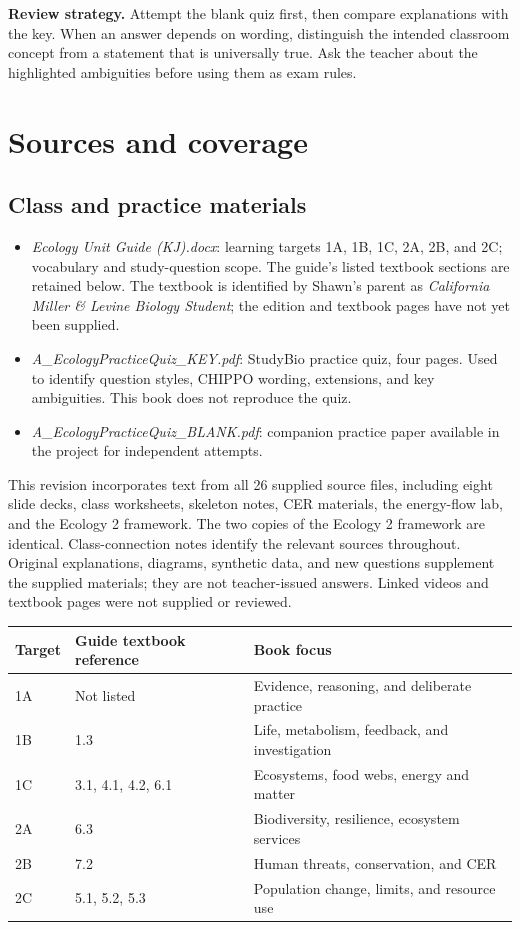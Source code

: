 \documentclass[11pt,letterpaper]{article}
\newcommand{\pagechapter}[2]{\clearpage\section*{#1}\phantomsection\label{#2}\addcontentsline{toc}{section}{#1}}
\begin{document}
\textbf{Review strategy.} Attempt the blank quiz first, then compare explanations with the key. When an answer depends on wording, distinguish the intended classroom concept from a statement that is universally true. Ask the teacher about the highlighted ambiguities before using them as exam rules.

\pagechapter{Sources and coverage}{sources}
\subsection*{Class and practice materials}
\begin{itemize}
\item \textit{Ecology Unit Guide (KJ).docx}: learning targets 1A, 1B, 1C, 2A, 2B, and 2C; vocabulary and study-question scope. The guide's listed textbook sections are retained below. The textbook is identified by Shawn's parent as \textit{California Miller \& Levine Biology Student}; the edition and textbook pages have not yet been supplied.
\item \textit{A\_EcologyPracticeQuiz\_KEY.pdf}: StudyBio practice quiz, four pages. Used to identify question styles, CHIPPO wording, extensions, and key ambiguities. This book does not reproduce the quiz.
\item \textit{A\_EcologyPracticeQuiz\_BLANK.pdf}: companion practice paper available in the project for independent attempts.
\end{itemize}
This revision incorporates text from all 26 supplied source files, including eight slide decks, class worksheets, skeleton notes, CER materials, the energy-flow lab, and the Ecology 2 framework. The two copies of the Ecology 2 framework are identical. Class-connection notes identify the relevant sources throughout. Original explanations, diagrams, synthetic data, and new questions supplement the supplied materials; they are not teacher-issued answers. Linked videos and textbook pages were not supplied or reviewed.
\par
\begin{tabularx}{\linewidth}{@{}l l Y@{}}\toprule
Target & Guide textbook reference & Book focus\\\midrule
1A & Not listed & Evidence, reasoning, and deliberate practice\\
1B & 1.3 & Life, metabolism, feedback, and investigation\\
1C & 3.1, 4.1, 4.2, 6.1 & Ecosystems, food webs, energy and matter\\
2A & 6.3 & Biodiversity, resilience, ecosystem services\\
2B & 7.2 & Human threats, conservation, and CER\\
2C & 5.1, 5.2, 5.3 & Population change, limits, and resource use\\\bottomrule
\end{tabularx}
\par
\end{document}
